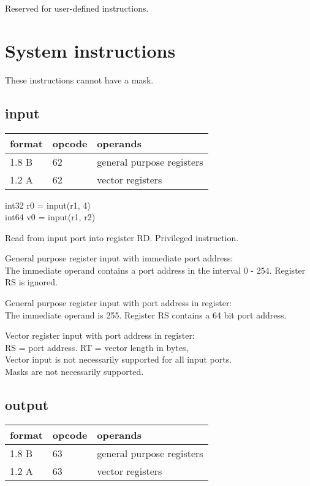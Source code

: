 \documentclass[forwardcom.tex]{subfiles}
\begin{document}
Reserved for user-defined instructions.
\vv


\section{System instructions}
These instructions cannot have a mask.
\vv

\subsection{input}

\label{table:inputInstruction}
\begin{tabular}{|p{12mm}|p{15mm}|p{100mm}|}
\hline
\bfseries format & \bfseries opcode & \bfseries operands \\ \hline
1.8 B & 62 & general purpose registers \\ \hline
1.2 A & 62 & vector registers \\ \hline
\end{tabular}
\vv

int32 r0 = input(r1, 4) \\
int64 v0 = input(r1, r2)
\vv

Read from input port into register RD. Privileged instruction.
\vv

General purpose register input with immediate port address:\\
The immediate operand contains a port address in the interval 0 - 254. Register RS is ignored.
\vv

General purpose register input with port address in register:\\
The immediate operand is 255. Register RS contains a 64 bit port address.
\vv

Vector register input with port address in register:\\
RS = port address. RT = vector length in bytes, \\
Vector input is not necessarily supported for all input ports.\\
Masks are not necessarily supported. 
\vv


\subsection{output}
\label{table:outputInstruction}
\begin{tabular}{|p{12mm}|p{15mm}|p{100mm}|}
\hline
\bfseries format & \bfseries opcode & \bfseries operands \\ \hline
1.8 B & 63 & general purpose registers \\ \hline
1.2 A & 63 & vector registers \\ \hline
\end{tabular}
\vv
\end{document}

